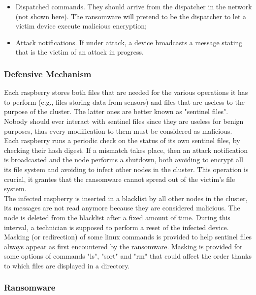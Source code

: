 \begin{itemize}
 \item Dispatched commands. They should arrive from the dispatcher in the network (not shown here). The ransomware will pretend to be the dispatcher to let a victim device execute malicious encryption;
  \item Attack notifications. If under attack, a device broadcasts a message stating that is the victim of an attack in progress.
\end{itemize}


\subsubsection{Defensive Mechanism}

\noindent Each raspberry stores both files that are needed for the various operations it has to perform (e.g., files storing data from sensors) and files that are useless to the purpose of the cluster. The latter ones are better known as "sentinel files". Nobody should ever interact with sentinel files since they are useless for benign purposes, thus every modification to them must be considered as malicious.\\
Each raspberry runs a periodic check on the status of its own sentinel files, by checking their hash digest. If a mismatch takes place, then an attack notification is broadcasted and the node performs a shutdown, both avoiding to encrypt all its file system and avoiding to infect other nodes in the cluster. This operation is crucial, it grantes that the ransomware cannot spread out of the victim's file system. \\
The infected raspberry is inserted in a blacklist by all other nodes in the cluster, its messages are not read anymore because they are considered malicious. The node is deleted from the blacklist after a fixed amount of time. During this interval, a technician is supposed to perform a reset of the infected device.\\
Masking (or redirection) of some linux commands is provided to help sentinel files always appear as first encountered by the ransomware. Masking is provided for some options of commands "ls", "sort" and "rm" that could affect the order thanks to which files are displayed in a directory.

\subsubsection{Ransomware}

